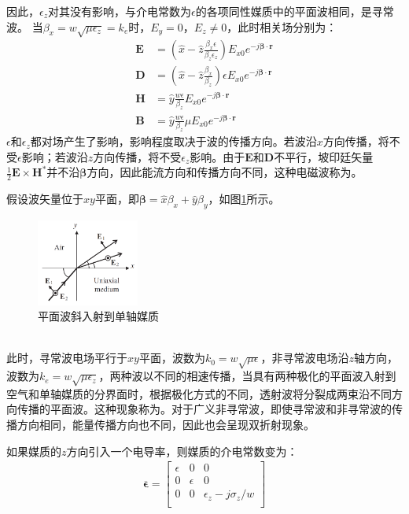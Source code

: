 \documentclass{article}
\numberwithin{equation}{section}
\renewcommand{\vec}[1]{\boldsymbol{#1}}
\begin{document}
因此，$\epsilon_z$对其没有影响，与介电常数为$\epsilon$的各项同性媒质中的平面波相同，是寻常波。
当$\beta_x=w\sqrt{\mu\epsilon_z}=k_e$时，$E_y=0$，$E_z\neq0$，此时相关场分别为：
\begin{align}
    \label{eq:eq477}
    \mathbf{E}&=(\hat{x}-\hat{z}\frac{\beta_x\epsilon}{\beta_z\epsilon_z})E_{x0}e^{-j\vec{\beta}\cdot\vec{r}} \\
    \label{eq:eq478}
    \mathbf{D}&=(\hat{x}-\hat{z}\frac{\beta_x}{\beta_z})\epsilon E_{x0}e^{-j\vec{\beta}\cdot\vec{r}} \\
    \label{eq:eq479}
    \mathbf{H}&=\hat{y}\frac{w\epsilon}{\beta_z}E_{x0}e^{-j\vec{\beta}\cdot\vec{r}} \\
    \label{eq:eq480}
    \mathbf{B}&=\hat{y}\frac{w\epsilon}{\beta_z}\mu E_{x0}e^{-j\vec{\beta}\cdot\vec{r}}
\end{align}
$\epsilon$和$\epsilon_z$都对场产生了影响，影响程度取决于波的传播方向。若波沿$x$方向传播，将不受$\epsilon$影响；若波沿$z$方向传播，将不受$\epsilon_z$影响。由于$\mathbf{E}$和$\mathbf{D}$不平行，坡印廷矢量$\frac{1}{2}\mathbf{E}\times\mathbf{H}^*$并不沿$\vec{\beta}$方向，因此能流方向和传播方向不同，这种电磁波称为\textbf{\color{blue}{广义非寻常波}}。 \par
假设波矢量位于$xy$平面，即$\vec{\beta}=\hat{x}\beta_x+\hat{y}\beta_y$，如图\ref{fig:fig47}所示。
\begin{figure}[ht]
    \centering
    \includegraphics[width=0.3\textwidth]{平面波斜入射到单轴媒质.PNG}
    \caption{平面波斜入射到单轴媒质}
    \label{fig:fig47}
\end{figure}
\\
此时，寻常波电场平行于$xy$平面，波数为$k_0=w\sqrt{\mu\epsilon}$，非寻常波电场沿$z$轴方向，波数为$k_e=w\sqrt{\mu\epsilon_z}$，两种波以不同的相速传播，当具有两种极化的平面波入射到空气和单轴媒质的分界面时，根据极化方式的不同，透射波将分裂成两束沿不同方向传播的平面波。这种现象称为\textbf{\color{blue}{双折射}}。对于广义非寻常波，即使寻常波和非寻常波的传播方向相同，能量传播方向也不同，因此也会呈现双折射现象。\par
如果媒质的$z$方向引入一个电导率，则媒质的介电常数变为：
\begin{align}
    \label{eq:eq481}
    \overline{\vec{\epsilon}}=
        \left[
            \begin{matrix}
                \epsilon & 0 & 0 \\
                0 & \epsilon & 0 \\
                0 & 0 & \epsilon_z-j\sigma_z/w \\
            \end{matrix}
        \right]
\end{align}
\end{document}
